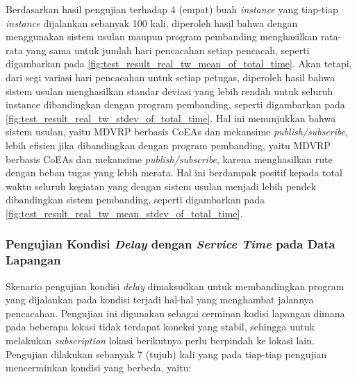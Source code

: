 Berdasarkan hasil pengujian terhadap 4 (empat) buah \textit{instance} yang tiap-tiap \textit{instance} dijalankan sebanyak 100 kali, diperoleh hasil bahwa dengan menggunakan sistem usulan maupun program pembanding menghasilkan rata-rata yang sama untuk jumlah hari pencacahan setiap pencacah, seperti digambarkan pada \autoref{fig:test_result_real_tw_mean_of_total_time}. Akan tetapi, dari segi variasi hari pencacahan untuk setiap petugas, diperoleh hasil bahwa sistem usulan menghasilkan standar deviasi yang lebih rendah untuk seluruh instance dibandingkan dengan program pembanding, seperti digambarkan pada \autoref{fig:test_result_real_tw_stdev_of_total_time}. Hal ini menunjukkan bahwa sistem usulan, yaitu MDVRP berbasis CoEAs dan mekansime \textit{publish/subscribe}, lebih efisien jika dibandingkan dengan program pembanding, yaitu MDVRP berbasis CoEAs dan mekansime \textit{publish/subscribe}, karena menghasilkan rute dengan beban tugas yang lebih merata. Hal ini berdampak positif kepada total waktu seluruh kegiatan yang dengan sistem usulan menjadi lebih pendek dibandingkan sistem pembanding, seperti digambarkan pada \autoref{fig:test_result_real_tw_mean_stdev_of_total_time}.


\subsubsection{Pengujian Kondisi \textit{Delay} dengan \textit{Service Time} pada Data Lapangan}
\label{sssec:test-delay-service-time}
Skenario pengujian kondisi \textit{delay} dimaksudkan untuk membandingkan program yang dijalankan pada kondisi terjadi hal-hal yang menghambat jalannya pencacahan. Pengujian ini digunakan sebagai cerminan kodisi lapangan dimana pada beberapa lokasi tidak terdapat koneksi yang stabil, sehingga untuk melakukan \textit{subscription} lokasi berikutnya perlu berpindah ke lokasi lain. Pengujian dilakukan sebanyak 7 (tujuh) kali yang pada tiap-tiap pengujian mencerminkan kondisi yang berbeda, yaitu:

